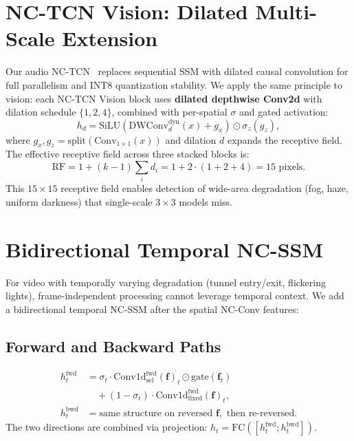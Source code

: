\documentclass[journal]{IEEEtran}
\begin{document}
\section{NC-TCN Vision: Dilated Multi-Scale Extension}
\label{sec:nctcn}

Our audio NC-TCN~\cite{choi2026nctcn} replaces sequential SSM with dilated causal convolution for full parallelism and INT8 quantization stability.
We apply the same principle to vision: each NC-TCN Vision block uses \textbf{dilated depthwise Conv2d} with dilation schedule $\{1, 2, 4\}$, combined with per-spatial $\sigma$ and gated activation:
\begin{equation}
h_d = \text{SiLU}(\text{DWConv}_{d}^{\text{dyn}}(x) + g_x) \odot \sigma_z(g_z),
\end{equation}
where $g_x, g_z = \text{split}(\text{Conv}_{1\times 1}(x))$ and dilation $d$ expands the receptive field.
The effective receptive field across three stacked blocks is:
\begin{equation}
\text{RF} = 1 + (k-1)\sum_{i} d_i = 1 + 2 \cdot (1+2+4) = 15 \text{ pixels}.
\end{equation}
This $15\times 15$ receptive field enables detection of wide-area degradation (fog, haze, uniform darkness) that single-scale $3\times 3$ models miss.


\section{Bidirectional Temporal NC-SSM}
\label{sec:temporal}

For video with temporally varying degradation (tunnel entry/exit, flickering lights), frame-independent processing cannot leverage temporal context.
We add a bidirectional temporal NC-SSM after the spatial NC-Conv features:

\subsection{Forward and Backward Paths}
\begin{align}
h_t^{\text{fwd}} &= \sigma_t \cdot \text{Conv1d}_{\text{sel}}^{\text{fwd}}(\mathbf{f})_t \odot \text{gate}(\mathbf{f}_t) \nonumber \\
&\quad + (1-\sigma_t) \cdot \text{Conv1d}_{\text{fixed}}^{\text{fwd}}(\mathbf{f})_t, \\
h_t^{\text{bwd}} &= \text{same structure on reversed } \mathbf{f}, \text{ then re-reversed}.
\end{align}
The two directions are combined via projection: $h_t = \text{FC}([h_t^{\text{fwd}}; h_t^{\text{bwd}}])$.
\end{document}
